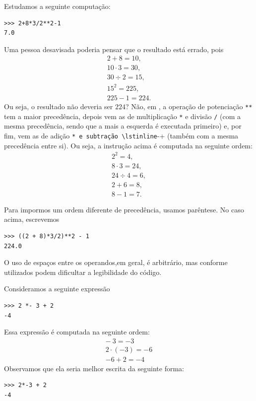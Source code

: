 \begin{ex}
  Estudamos a seguinte computação:

\begin{lstlisting}
>>> 2+8*3/2**2-1
7.0
\end{lstlisting}

  Uma pessoa desavisada poderia pensar que o resultado está errado, pois
  \begin{gather}
    2+8 = 10,\\
    10 \cdot 3 = 30,\\
    30 \div 2 = 15,\\
    15^2 = 225,\\
    225 - 1 = 224.
  \end{gather}
  Ou seja, o resultado não deveria ser $224$? Não, em {\python}, a operação de potenciação \lstinline+**+ tem a maior precedência, depois vem as de multiplicação \lstinline+*+ e divisão \lstinline+/+ (com a mesma precedência, sendo que a mais a esquerda é executada primeiro) e, por fim, vem as de adição \lstinline*+* e subtração \lstinline+-+ (também com a mesma precedência entre si). Ou seja, a instrução acima é computada na seguinte ordem:
  \begin{gather}
    2^2 = 4,\\
    8\cdot 3 = 24,\\
    24\div 4 = 6,\\
    2 + 6 = 8,\\
    8 - 1 = 7.
  \end{gather}

  Para impormos um ordem diferente de precedência, usamos parêntese. No caso acima, escrevemos

\begin{lstlisting}
>>> ((2 + 8)*3/2)**2 - 1
224.0
\end{lstlisting}

\end{ex}

O uso de espaços entre os operandos,em geral, é arbitrário, mas conforme utilizados podem dificultar a legibilidade do código.

\begin{ex}
  Consideramos a seguinte expressão

\begin{lstlisting}
>>> 2 *- 3 + 2
-4
\end{lstlisting}

  Essa expressão é computada na seguinte ordem:
  \begin{gather}
    -~3 = -3\\
    2\cdot(-3) = -6\\
    -6 + 2 = -4
  \end{gather}
  Observamos que ela seria melhor escrita da seguinte forma:

\begin{lstlisting}
>>> 2*-3 + 2
-4
\end{lstlisting}

\end{ex}

